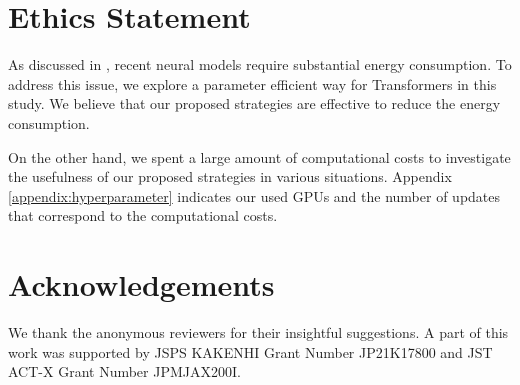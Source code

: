 \documentclass[11pt]{article}
\begin{document}
\section*{Ethics Statement}
As discussed in \citet{strubell-etal-2019-energy}, recent neural models require substantial energy consumption.
To address this issue, we explore a parameter efficient way for Transformers in this study.
We believe that our proposed strategies are effective to reduce the energy consumption.

On the other hand, we spent a large amount of computational costs to investigate the usefulness of our proposed strategies in various situations.
Appendix \ref{appendix:hyperparameter} indicates our used GPUs and the number of updates that correspond to the computational costs.

\section*{Acknowledgements}
We thank the anonymous reviewers for their insightful suggestions.
A part of this work was supported by JSPS KAKENHI Grant Number JP21K17800 and JST ACT-X Grant Number JPMJAX200I.
\end{document}
